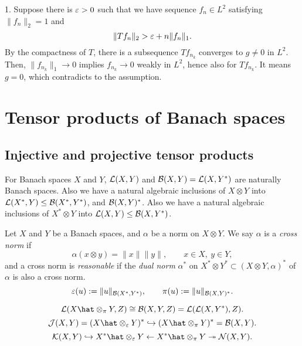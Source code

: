 \documentclass{../../large}
\begin{document}
\begin{pf}
1. Suppose there is $\varepsilon>0$ such that we have sequence $f_n\in L^2$ satisfying $\|f_n\|_2=1$ and
\[\|Tf_n\|_2>\varepsilon+n\|f_n\|_1.\]
By the compactness of $T$, there is a subsequence $Tf_{n_k}$ converges to $g\ne0$ in $L^2$.
Then, $\|f_{n_k}\|_1\to0$ implies $f_{n_k}\to0$ weakly in $L^2$, hence also for $Tf_{n_k}$.
It means $g=0$, which contradicts to the assumption.
\end{pf}




\chapter{Tensor products of Banach spaces}

\section{Injective and projective tensor products}

\begin{prb}[Realizations]
For Banach spaces $X$ and $Y$, $\mathcal{L}(X,Y)$ and $\mathcal{B}(X,Y)=\mathcal{L}(X,Y^*)$ are naturally Banach spaces.
Also we have a natural algebraic inclusions of $X\otimes Y$ into $\mathcal{L}(X^*,Y)\le\mathcal{B}(X^*,Y^*)$, and $\mathcal{B}(X,Y)^*$.
Also we have a natural algebraic inclusions of $X^*\otimes Y$ into $\mathcal{L}(X,Y)\le\mathcal{B}(X,Y^*)$.
\end{prb}

\begin{prb}
Let $X$ and $Y$ be a Banach spaces, and $\alpha$ be a norm on $X\otimes Y$.
We say $\alpha$ is a \emph{cross norm} if
\[\alpha(x\otimes y)=\|x\|\|y\|,\qquad x\in X,\ y\in Y,\]
and a cross norm is \emph{reasonable} if the \emph{dual norm} $\alpha^*$ on $X^*\otimes Y^*\subset(X\otimes Y,\alpha)^*$ of $\alpha$ is also a cross norm.
\[\varepsilon(u):=\|u\|_{\mathcal{B}(X^*,Y^*)},\qquad\pi(u):=\|u\|_{\mathcal{B}(X,Y)^*}.\]
\end{prb}

\begin{prb}
\end{prb}

\begin{prb}
\[\cL(X\hat\otimes_\pi Y,Z)\cong\cB(X,Y,Z)=\cL(\cL(X,Y^*),Z).\]
\[\cJ(X,Y)=(X\hat\otimes_\e Y)^*\hookrightarrow(X\hat\otimes_\pi Y)^*=\cB(X,Y).\]
\[\cK(X,Y)\hookrightarrow X^*\hat\otimes_\e Y\leftarrow X^*\hat\otimes_\pi Y\twoheadrightarrow\cN(X,Y).\]
	
\end{prb}
\end{document}

